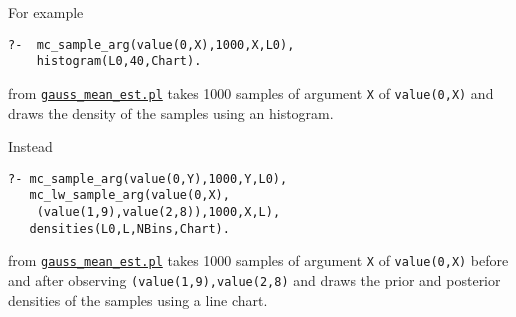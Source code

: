 For example
\begin{verbatim}
?-  mc_sample_arg(value(0,X),1000,X,L0),
    histogram(L0,40,Chart).
\end{verbatim}
from \href{http://cplint.lamping.unife.it/example/inference/gauss_mean_est.pl}{\texttt{gauss\_mean\_est.pl}}
takes 1000 samples of argument \verb|X| of \verb|value(0,X)| and draws the density of the samples using an histogram.

Instead
\begin{verbatim}
?- mc_sample_arg(value(0,Y),1000,Y,L0),
   mc_lw_sample_arg(value(0,X),
    (value(1,9),value(2,8)),1000,X,L),
   densities(L0,L,NBins,Chart).
\end{verbatim}
from \href{http://cplint.lamping.unife.it/example/inference/gauss_mean_est.pl}{\texttt{gauss\_mean\_est.pl}}
takes 1000 samples of argument \verb|X| of \verb|value(0,X)| before and after observing
\verb|(value(1,9),value(2,8)| and draws the prior and posterior densities of the samples using a line chart.
